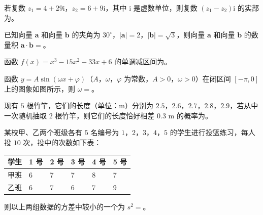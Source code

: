 


\begin{question}
若复数 $z_1=4+29\mathrm i$，$z_2=6+9\mathrm i$，其中 $\mathrm i$ 是虚数单位，则复数 $(z_1-z_2)\mathrm i$ 的实部为\gkblank{}。

\end{question}
\begin{question}
已知向量 $\boldsymbol a$ 和向量 $\boldsymbol b$ 的夹角为 $30^\circ$，$|\boldsymbol a|=2$，$|\boldsymbol b|=\sqrt3$，则向量 $\boldsymbol a$ 和向量 $\boldsymbol b$ 的数量积 $\boldsymbol a\cdot\boldsymbol b=$\gkblank{}。

\end{question}
\begin{question}
函数 $f(x)=x^3-15x^2-33x+6$ 的单调减区间为\gkblank{}。

\Needspace{0.4\textheight}
\end{question}
\begin{question}
函数 $y=A\sin(\omega x+\varphi)$（$A$，$\omega$，$\varphi$ 为常数，$A>0$，$\omega>0$）在闭区间 $[-\pi,0]$ 上的图象如图所示，则 $\omega=$\gkblank{}。
\nopagebreak[4]
\begin{center}\end{center}
\nopagebreak[4]
\end{question}
\begin{question}
现有 $5$ 根竹竿，它们的长度（单位：m）分别为 $2.5$，$2.6$，$2.7$，$2.8$，$2.9$，若从中一次随机抽取 $2$ 根竹竿，则它们的长度恰好相差 $0.3$ m 的概率为\gkblank{}。

\end{question}
\begin{question}
某校甲、乙两个班级各有 $5$ 名编号为 $1$，$2$，$3$，$4$，$5$ 的学生进行投篮练习，每人投 $10$ 次，投中的次数如下表：

\begin{center}
\begin{tabular}{llllll}
\toprule
学生 & 1 号 & 2 号 & 3 号 & 4 号 & 5 号 \\
\midrule
甲班 & 6 & 7 & 7 & 8 & 7 \\
乙班 & 6 & 7 & 6 & 7 & 9 \\
\bottomrule
\end{tabular}
\end{center}

则以上两组数据的方差中较小的一个为 $s^2=$\gkblank{}。

\Needspace{0.4\textheight}
\end{question}
